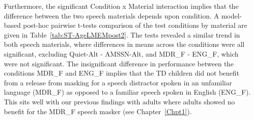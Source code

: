 \documentclass[a4paper, twoside]{templates/ociamthesis}
\begin{document}
Furthermore, the significant Condition x Material interaction implies that the difference between the two speech materials depends upon condition. A model-based post-hoc pairwise t-tests comparison of the test conditions by material are given in Table~\ref{tab:ST-AgeLMEMpost2}. The tests revealed a similar trend in both speech materials, where differences in means across the conditions were all significant, excluding Quiet-Alt - AMSSN-Alt, and MDR\_F - ENG\_F, which were not significant. The insignificant difference in performance between the conditions MDR\_F and ENG\_F implies that the TD children did not benefit from a release from masking for a speech distractor spoken in an unfamiliar language (MDR\_F) as opposed to a familiar speech spoken in English (ENG\_F). This sits well with our previous findings with adults where adults showed no benefit for the MDR\_F speech masker (see Chapter~\ref{Chpt1}).~
\end{document}
